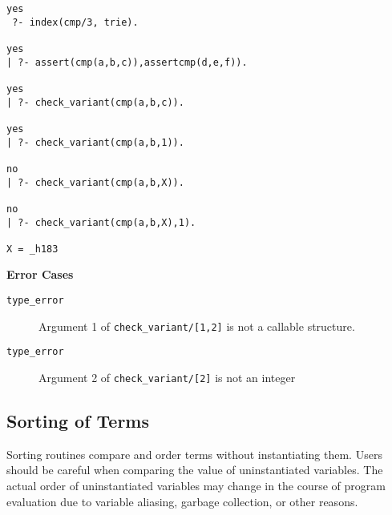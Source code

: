 \begin{description}
\begin{example}
\begin{small}
\begin{verbatim}
yes
 ?- index(cmp/3, trie).

yes
| ?- assert(cmp(a,b,c)),assertcmp(d,e,f)).

yes
| ?- check_variant(cmp(a,b,c)).

yes
| ?- check_variant(cmp(a,b,1)).

no
| ?- check_variant(cmp(a,b,X)).

no
| ?- check_variant(cmp(a,b,X),1).

X = _h183
\end{verbatim}
\end{small}
\end{example}

{\bf Error Cases}
     \begin{description}
     \item[{\tt type\_error}]
	Argument 1 of {\tt check\_variant/[1,2]} is not a callable structure.
     \item[{\tt type\_error}]
	Argument 2 of {\tt check\_variant/[2]} is not an integer
     \end{description}

\end{description}

\subsection{Sorting of Terms}

Sorting routines compare and order terms without instantiating them.
Users should be careful when comparing the value of uninstantiated
variables.  The actual order of uninstantiated variables may change in
the course of program evaluation due to variable aliasing, garbage
collection, or other reasons.

